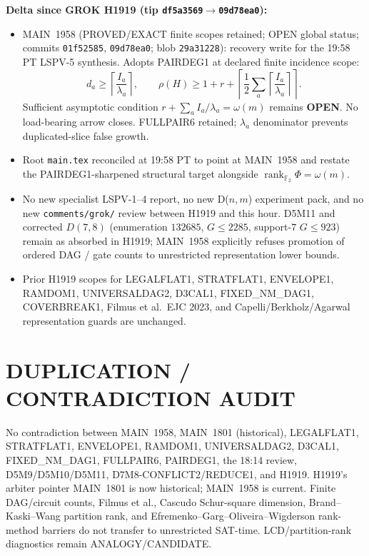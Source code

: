 \documentclass[11pt]{article}
\begin{document}
\textbf{Delta since GROK H1919 (tip \texttt{df5a3569}$\to$\texttt{09d78ea0}):}
\begin{itemize}
\item MAIN~1958 (PROVED/EXACT finite scopes retained; OPEN global status; commits
\texttt{01f52585}, \texttt{09d78ea0}; blob \texttt{29a31228}): recovery write for
the 19:58 PT LSPV-5 synthesis. Adopts PAIRDEG1 at declared finite incidence
scope:
\[
d_a\ge\left\lceil\frac{I_a}{\lambda_a}\right\rceil,\qquad
\rho(H)\ge 1+r+\left\lceil\frac12\sum_a\left\lceil\frac{I_a}{\lambda_a}\right\rceil\right\rceil.
\]
Sufficient asymptotic condition $r+\sum_a I_a/\lambda_a=\omega(m)$ remains
\textbf{OPEN}. No load-bearing arrow closes. FULLPAIR6 retained; $\lambda_a$
denominator prevents duplicated-slice false growth.
\item Root \texttt{main.tex} reconciled at 19:58 PT to point at MAIN~1958 and
restate the PAIRDEG1-sharpened structural target alongside
$\operatorname{rank}_{\mathbb F_2}\Phi=\omega(m)$.
\item No new specialist LSPV-1--4 report, no new D($n,m$) experiment pack, and no
new \texttt{comments/grok/} review between H1919 and this hour. D5M11 and
corrected $D(7,8)$ (enumeration $132685$, $G\le 2285$, support-$7$ $G\le 923$)
remain as absorbed in H1919; MAIN~1958 explicitly refuses promotion of ordered
DAG / gate counts to unrestricted representation lower bounds.
\item Prior H1919 scopes for LEGALFLAT1, STRATFLAT1, ENVELOPE1, RAMDOM1,
UNIVERSALDAG2, D3CAL1, FIXED\_NM\_DAG1, COVERBREAK1, Filmus et al.\ EJC 2023,
and Capelli/Berkholz/Agarwal representation guards are unchanged.
\end{itemize}

\section*{DUPLICATION / CONTRADICTION AUDIT}
No contradiction between MAIN~1958, MAIN~1801 (historical), LEGALFLAT1,
STRATFLAT1, ENVELOPE1, RAMDOM1, UNIVERSALDAG2, D3CAL1, FIXED\_NM\_DAG1,
FULLPAIR6, PAIRDEG1, the 18:14 review, D5M9/D5M10/D5M11, D7M8-CONFLICT2/REDUCE1,
and H1919. H1919's arbiter pointer MAIN~1801 is now historical; MAIN~1958 is
current. Finite DAG/circuit counts, Filmus et al., Cascudo Schur-square
dimension, Brand--Kaski--Wang partition rank, and Efremenko--Garg--Oliveira--Wigderson
rank-method barriers do not transfer to unrestricted SAT-time.
LCD/partition-rank diagnostics remain ANALOGY/CANDIDATE.
\end{document}
